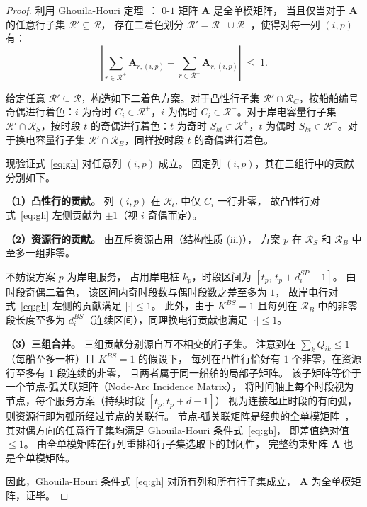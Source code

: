 \documentclass[UTF8, a4paper, 12pt]{ctexart}
\begin{document}
\begin{proof}
利用 Ghouila-Houri 定理~\cite{Papadimitriou1998}：
$0$-$1$ 矩阵 $\mathbf{A}$ 是全单模矩阵，
当且仅当对于 $\mathbf{A}$ 的任意行子集 $\mathcal{R}'\subseteq\mathcal{R}$，
存在二着色划分 $\mathcal{R}'=\mathcal{R}^+\cup\mathcal{R}^-$，使得对每一列 $(i,p)$ 有：
\begin{equation}
  \left|
    \sum_{r\in\mathcal{R}^+}\mathbf{A}_{r,(i,p)}
    -
    \sum_{r\in\mathcal{R}^-}\mathbf{A}_{r,(i,p)}
  \right|
  \;\le\; 1.
  \label{eq:gh}
\end{equation}

给定任意 $\mathcal{R}'\subseteq\mathcal{R}$，构造如下二着色方案。对于凸性行子集 $\mathcal{R}'\cap\mathcal{R}_C$，按船舶编号奇偶进行着色：$i$ 为奇时 $C_i\in\mathcal{R}^+$，$i$ 为偶时 $C_i\in\mathcal{R}^-$。对于岸电容量行子集 $\mathcal{R}'\cap\mathcal{R}_S$，按时段 $t$ 的奇偶进行着色：$t$ 为奇时 $S_{kt}\in\mathcal{R}^+$，$t$ 为偶时 $S_{kt}\in\mathcal{R}^-$。对于换电容量行子集 $\mathcal{R}'\cap\mathcal{R}_B$，同样按时段 $t$ 的奇偶进行着色。

现验证式~\eqref{eq:gh} 对任意列 $(i,p)$ 成立。
固定列 $(i,p)$，其在三组行中的贡献分别如下。

\medskip
\noindent\textbf{（1）凸性行的贡献。}
列 $(i,p)$ 在 $\mathcal{R}_C$ 中仅 $C_i$ 一行非零，
故凸性行对式~\eqref{eq:gh} 左侧贡献为 $\pm 1$（视 $i$ 奇偶而定）。

\medskip
\noindent\textbf{（2）资源行的贡献。}
由互斥资源占用（结构性质 (iii)），
方案 $p$ 在 $\mathcal{R}_S$ 和 $\mathcal{R}_B$ 中至多一组非零。

不妨设方案 $p$ 为岸电服务，
占用岸电桩 $k_p$，时段区间为 $[t_p,\,t_p+d_i^{SP}-1]$。
由时段奇偶二着色，
该区间内奇时段数与偶时段数之差至多为 $1$，
故岸电行对式~\eqref{eq:gh} 左侧的贡献满足 $|\cdot|\le 1$。
此外，由于 $K^{BS}=1$ 且每列在 $\mathcal{R}_B$ 中的非零段长度至多为
$d_i^{BS}$（连续区间），同理换电行贡献也满足 $|\cdot|\le 1$。

\medskip
\noindent\textbf{（3）三组合并。}
三组贡献分别源自互不相交的行子集。
注意到在 $\sum_k Q_{ik}\le 1$（每船至多一桩）且 $K^{BS}=1$ 的假设下，
每列在凸性行恰好有 $1$ 个非零，在资源行至多有 $1$ 段连续的非零，
且两者属于同一船舶的局部子矩阵。
该子矩阵等价于一个节点-弧关联矩阵（Node-Arc Incidence Matrix），
将时间轴上每个时段视为节点，每个服务方案（持续时段 $[t_p, t_p+d-1]$）
视为连接起止时段的有向弧，则资源行即为弧所经过节点的关联行。
节点-弧关联矩阵是经典的全单模矩阵~\cite{Nemhauser1988}，
其对偶方向的任意行子集均满足 Ghouila-Houri 条件式~\eqref{eq:gh}，
即差值绝对值 $\le 1$。
由全单模矩阵在行列重排和行子集选取下的封闭性，
完整约束矩阵 $\mathbf{A}$ 也是全单模矩阵。

因此，Ghouila-Houri 条件式~\eqref{eq:gh} 对所有列和所有行子集成立，
$\mathbf{A}$ 为全单模矩阵，证毕。
\end{proof}
\end{document}
